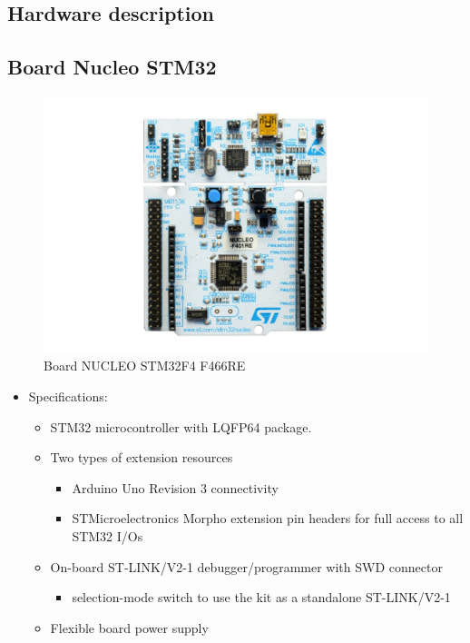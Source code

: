 \documentclass[D:/Latex/Internship/Report/Latex/Report.tex]{subfiles}
\begin{document}
	\begin{otherlanguage}{english}
		\section{Hardware description}
		\label{sec:Hardware description}
		\subsection{Board Nucleo STM32}
		\label{subsec:Board Nucleo STM32}
			\begin{figure}[h!]
				\centering
				\includegraphics[width = 0.9\linewidth]{Figure/Board.pdf}
				\caption{Board NUCLEO STM32F4 F466RE}
			\end{figure}
			\begin{itemize}
				\item Specifications:
				\begin{itemize}
					\item STM32 microcontroller with LQFP64 package.
					\item Two types of extension resources
					\begin{itemize}
						\item Arduino Uno Revision 3 connectivity
						\item STMicroelectronics Morpho extension pin headers for full access to all STM32 I/Os
					\end{itemize}
					\item On-board ST-LINK/V2-1 debugger/programmer with SWD connector
					\begin{itemize}
						\item selection-mode switch to use the kit as a standalone ST-LINK/V2-1
					\end{itemize}
					\item Flexible board power supply

\end{itemize}
\end{itemize}
\end{otherlanguage}
\end{document}
